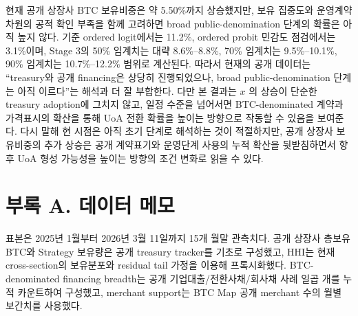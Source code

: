 \documentclass[11pt,a4paper]{article}
\begin{document}
현재 공개 상장사 BTC 보유비중은 약 5.50\%까지 상승했지만, 보유 집중도와 운영계약 차원의 공적 확인 부족을 함께 고려하면 broad public-denomination 단계의 확률은 아직 높지 않다. 기준 ordered logit에서는 11.2\%, ordered probit 민감도 점검에서는 3.1\%이며, Stage 3의 50\% 임계치는 대략 8.6\%--8.8\%, 70\% 임계치는 9.5\%--10.1\%, 90\% 임계치는 10.7\%--12.2\% 범위로 계산된다. 따라서 현재의 공개 데이터는 ``treasury와 공개 financing은 상당히 진행되었으나, broad public-denomination 단계는 아직 이르다''는 해석과 더 잘 부합한다. 다만 본 결과는 $x$ 의 상승이 단순한 treasury adoption에 그치지 않고, 일정 수준을 넘어서면 BTC-denominated 계약과 가격표시의 확산을 통해 UoA 전환 확률을 높이는 방향으로 작동할 수 있음을 보여준다. 다시 말해 현 시점은 아직 초기 단계로 해석하는 것이 적절하지만, 공개 상장사 보유비중의 추가 상승은 공개 계약표기와 운영단계 사용의 누적 확산을 뒷받침하면서 향후 UoA 형성 가능성을 높이는 방향의 조건 변화로 읽을 수 있다.

\section*{부록 A. 데이터 메모}

표본은 2025년 1월부터 2026년 3월 11일까지 15개 월말 관측치다. 공개 상장사 총보유 BTC와 Strategy 보유량은 공개 treasury tracker를 기초로 구성했고, HHI는 현재 cross-section의 보유분포와 residual tail 가정을 이용해 프록시화했다. BTC-denominated financing breadth는 공개 기업대출/전환사채/회사채 사례 일곱 개를 누적 카운트하여 구성했고, merchant support는 BTC Map 공개 merchant 수의 월별 보간치를 사용했다.
\end{document}

